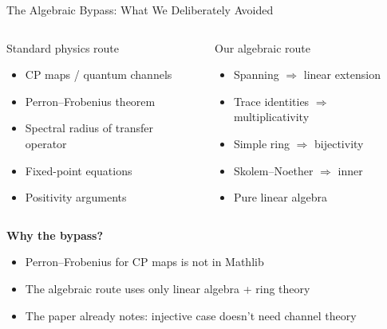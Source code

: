 \documentclass[aspectratio=169,10pt]{beamer}
\begin{document}
\begin{frame}{The Algebraic Bypass: What We Deliberately Avoided}
\begin{columns}[T]
\begin{block}{\textcolor{softred}{Standard physics route}}
\begin{itemize}
\item CP maps / quantum channels
\item Perron--Frobenius theorem
\item Spectral radius of transfer operator
\item Fixed-point equations
\item Positivity arguments
\end{itemize}
\end{block}

\begin{block}{\textcolor{leangreen}{Our algebraic route}}
\begin{itemize}
\item Spanning $\Rightarrow$ linear extension
\item Trace identities $\Rightarrow$ multiplicativity
\item Simple ring $\Rightarrow$ bijectivity
\item Skolem--Noether $\Rightarrow$ inner
\item Pure linear algebra
\end{itemize}
\end{block}
\end{columns}

\vspace{0.5em}
\textbf{Why the bypass?}
\begin{itemize}
  \item Perron--Frobenius for CP maps is not in Mathlib
  \item The algebraic route uses only linear algebra + ring theory
  \item The paper already notes: injective case doesn't need channel theory
\end{itemize}
\end{frame}
\end{document}
